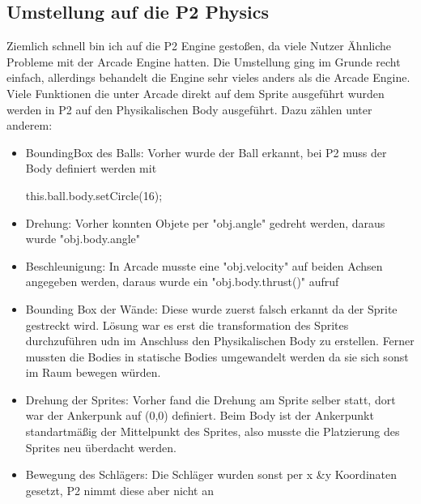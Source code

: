 \subsection{Umstellung auf die P2 Physics}
Ziemlich schnell bin ich auf die P2 Engine gestoßen, da viele Nutzer Ähnliche Probleme mit der Arcade Engine hatten.
\newline
Die Umstellung ging im Grunde recht einfach, allerdings behandelt die Engine sehr vieles anders als die Arcade Engine.
\newline
Viele Funktionen die unter Arcade direkt auf dem Sprite ausgeführt wurden werden in P2 auf den Physikalischen Body ausgeführt. Dazu zählen unter anderem:
\begin{itemize}
\item
BoundingBox des Balls: Vorher wurde der Ball erkannt, bei P2 muss der Body definiert werden mit 
\begin{listing}
this.ball.body.setCircle(16);
\end{listing}
\item
Drehung: Vorher konnten Objete per "obj.angle" gedreht werden, daraus wurde "obj.body.angle"
\item
Beschleunigung: In Arcade musste eine "obj.velocity" auf beiden Achsen angegeben werden, daraus wurde ein "obj.body.thrust()" aufruf
\item
Bounding Box der Wände: Diese wurde zuerst falsch erkannt da der Sprite gestreckt wird.
Lösung war es erst die transformation des Sprites durchzuführen udn im Anschluss den Physikalischen Body zu erstellen.
Ferner mussten die Bodies in statische Bodies umgewandelt werden da sie sich sonst im Raum bewegen würden.
\item
Drehung der Sprites: Vorher fand die Drehung am Sprite selber statt, dort war der Ankerpunk auf (0,0) definiert. Beim Body ist der Ankerpunkt standartmäßig der Mittelpunkt des Sprites, also musste die Platzierung des Sprites neu überdacht werden.
\item
Bewegung des Schlägers: Die Schläger wurden sonst per x &y Koordinaten gesetzt, P2 nimmt diese aber nicht an
\end{itemize}